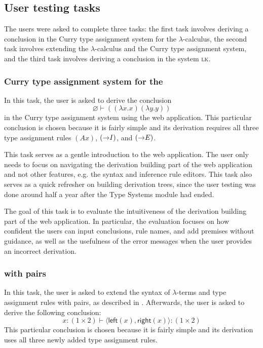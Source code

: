 \subsection{User testing tasks}
The users were asked to complete three tasks: the first task involves deriving a conclusion in the Curry type assignment system for the $\lambda$-calculus, the second task involves extending the $\lambda$-calculus and the Curry type assignment system, and the third task involves deriving a conclusion in the system \textsc{lk}.

\subsubsection{Curry type assignment system for the \lc{}}
In this task, the user is asked to derive the conclusion
\[
    \varnothing \vdash ((\lambda x. x)(\lambda y. y))
\]
in the Curry type assignment system using the web application. This particular conclusion is chosen because it is fairly simple and its derivation requires all three type assignment rules $(Ax)$, $(\mathord{\to} I)$, and $(\mathord{\to} E)$.

This task serves as a gentle introduction to the web application. The user only needs to focus on navigating the derivation building part of the web application and not other features, e.g. the syntax and inference rule editors. This task also serves as a quick refresher on building derivation trees, since the user testing was done around half a year after the Type Systems module had ended.

The goal of this task is to evaluate the intuitiveness of the derivation building part of the web application. In particular, the evaluation focuses on how confident the users can input conclusions, rule names, and add premises without guidance, as well as the usefulness of the error messages when the user provides an incorrect derivation.

\subsubsection{\lc{} with pairs}
In this task, the user is asked to extend the syntax of $\lambda$-terms and type assignment rules with pairs, as described in . Afterwards, the user is asked to derive the following conclusion:
\[
    x: (1 \times 2) \vdash \langle \textsf{left}(x), \textsf{right}(x) \rangle: (1 \times 2)
\]
This particular conclusion is chosen because it is fairly simple and its derivation uses all three newly added type assignment rules.

